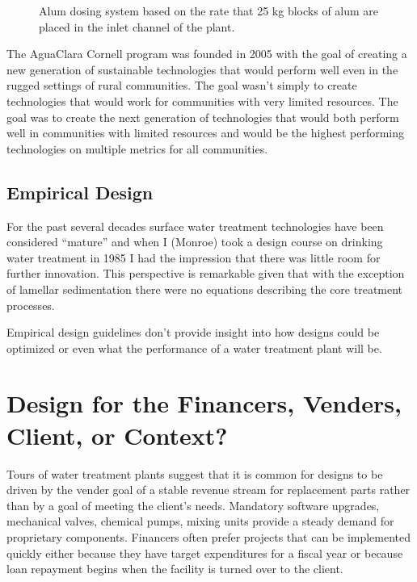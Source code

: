 \documentclass[letterpaper,10pt,english]{sphinxmanual}
\let\sphinxpxdimen\pdfpxdimen\else\newdimen\sphinxpxdimen
\begin{document}
\begin{figure}[htbp]
\centering
\capstart

\noindent\sphinxincludegraphics[width=300\sphinxpxdimen]{{Kathmandu_alum_dosing}.jpg}
\caption{Alum dosing system based on the rate that 25 kg blocks of alum are placed in the inlet channel of the plant.}\label{\detokenize{Introduction/Introduction:id21}}\label{\detokenize{Introduction/Introduction:figure-kathmandu-alum-dosing}}\end{figure}

The AguaClara Cornell program was founded in 2005 with the goal of creating a new generation of sustainable technologies that would perform well even in the rugged settings of rural communities. The goal wasn’t simply to create technologies that would work for communities with very limited resources. The goal was to create the next generation of technologies that would both perform well in communities with limited resources and would be the highest performing technologies on multiple metrics for all communities.


\subsection{Empirical Design}
\label{\detokenize{Introduction/Introduction:empirical-design}}\label{\detokenize{Introduction/Introduction:heading-empirical-design}}
For the past several decades surface water treatment technologies have been considered “mature” and when I (Monroe) took a design course on drinking water treatment in 1985 I had the impression that there was little room for further innovation. This perspective is remarkable given that with the exception of lamellar sedimentation there were no equations describing the core treatment processes.

Empirical design guidelines don’t provide insight into how designs could be optimized or even what the performance of a water treatment plant will be.


\section{Design for the Financers, Venders, Client, or Context?}
\label{\detokenize{Introduction/Introduction:design-for-the-financers-venders-client-or-context}}\label{\detokenize{Introduction/Introduction:heading-design-for-the-context}}
Tours of water treatment plants suggest that it is common for designs to be driven by the vender goal of a stable revenue stream for replacement parts rather than by a goal of meeting the client’s needs. Mandatory software upgrades, mechanical valves, chemical pumps, mixing units provide a steady demand for proprietary components. Financers often prefer projects that can be implemented quickly either because they have target expenditures for a fiscal year or because loan repayment begins when the facility is turned over to the client.
\end{document}
